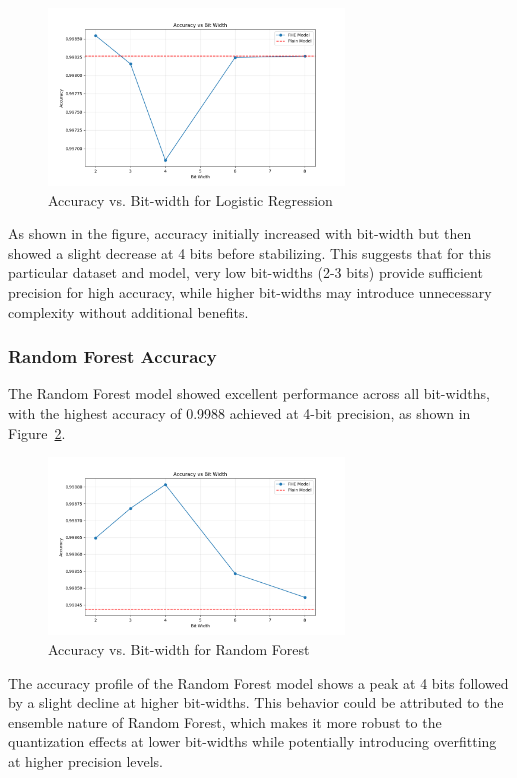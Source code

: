 \documentclass[a4paper,12pt]{article}
\begin{document}
\begin{figure}[h]
\centering
\includegraphics[width=0.7\textwidth]{results/lr/lr_accuracy.png}
\caption{Accuracy vs. Bit-width for Logistic Regression}
\label{fig:lr_accuracy_vs_bitwidth}
\end{figure}

As shown in the figure, accuracy initially increased with bit-width but then showed a slight decrease at 4 bits before stabilizing. This suggests that for this particular dataset and model, very low bit-widths (2-3 bits) provide sufficient precision for high accuracy, while higher bit-widths may introduce unnecessary complexity without additional benefits.

\subsubsection{Random Forest Accuracy}
The Random Forest model showed excellent performance across all bit-widths, with the highest accuracy of 0.9988 achieved at 4-bit precision, as shown in Figure~\ref{fig:rf_accuracy_vs_bitwidth}.

\begin{figure}[h]
\centering
\includegraphics[width=0.7\textwidth]{results/rf/rf_accuracy.png}
\caption{Accuracy vs. Bit-width for Random Forest}
\label{fig:rf_accuracy_vs_bitwidth}
\end{figure}

The accuracy profile of the Random Forest model shows a peak at 4 bits followed by a slight decline at higher bit-widths. This behavior could be attributed to the ensemble nature of Random Forest, which makes it more robust to the quantization effects at lower bit-widths while potentially introducing overfitting at higher precision levels.
\end{document}
